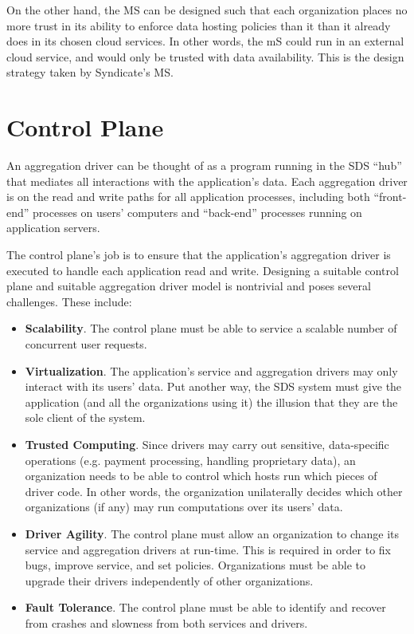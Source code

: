On the other hand, the MS can be designed such that each organization
places no more trust in its ability to enforce data hosting policies
than it than it already does in its chosen cloud services.  In other words, the
mS could run in an external cloud service, and would only be trusted
with data availability.  This is the design strategy taken by Syndicate's MS.

\section{Control Plane}

An aggregation driver can be thought of as a program running in the SDS ``hub''
that mediates all interactions with the application's data.  Each aggregation
driver is on the read and write paths for all application processes, including
both ``front-end'' processes on users' computers and
``back-end'' processes running on application servers.

The control plane's job is to ensure that the application's aggregation
driver is executed to handle each application read and write.
Designing a suitable control plane and suitable aggregation driver
model is nontrivial and poses several challenges.  These include:

\begin{itemize}
    \item \textbf{Scalability}.  The control plane must be able to service a
    scalable number of concurrent user requests. 
    \item \textbf{Virtualization}.  The application's service and aggregation
    drivers may only interact with its users' data.  Put another way,
      the SDS system must give the application (and all the organizations using
      it) the illusion that they are the sole client of the system.
    \item \textbf{Trusted Computing}.  Since drivers may carry out sensitive,
    data-specific operations (e.g. payment processing, handling proprietary
    data), an organization needs to be able to control which hosts run which
    pieces of driver code.  In other words, the organization unilaterally
      decides which other organizations (if any) may run computations over its
      users' data.
    \item \textbf{Driver Agility}.  The control plane must allow an organization to
    change its service and aggregation drivers at run-time.
    This is required in order to fix bugs, improve service, and set policies.
    Organizations must be able to upgrade their drivers independently of other organizations.
    \item \textbf{Fault Tolerance}.  The control plane must be able to identify
    and recover from crashes and slowness from both services and drivers.
\end{itemize}

